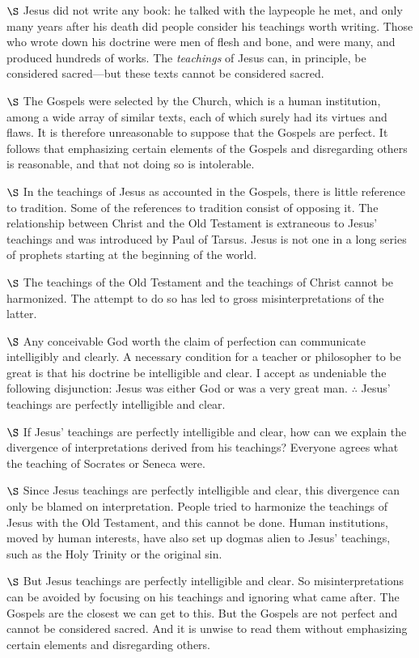 \documentclass[a4paper, 12pt]{article}
\begin{document}
$\S$ Jesus did not write any book: he talked with the laypeople he met, and only
many years after his death did people consider his teachings worth writing.
Those who wrote down his doctrine were men of flesh and bone, and were many, and
produced hundreds of works. The \textit{teachings} of Jesus can, in principle,
be considered sacred---but these texts cannot be considered sacred.

$\S$ The Gospels were selected by the Church, which is a human institution,
among a wide array of similar texts, each of which surely had its virtues and
flaws. It is therefore unreasonable to suppose that the Gospels are perfect. It
follows that emphasizing certain elements of the Gospels and disregarding others
is reasonable, and that not doing so is intolerable. 

$\S$ In the teachings of Jesus as accounted in the Gospels, there is little
reference to tradition. Some of the references to tradition consist of opposing
it. The relationship between Christ and the Old Testament is extraneous to
Jesus' teachings and was introduced by Paul of Tarsus. Jesus is not one in a
long series of prophets starting at the beginning of the world.

$\S$ The teachings of the Old Testament and the teachings of Christ cannot be
harmonized. The attempt to do so has led to gross misinterpretations of the
latter.

$\S$ Any conceivable God worth the claim of perfection can communicate intelligibly
and clearly. A necessary condition for a teacher or philosopher to be great is
that his doctrine be intelligible and clear. I accept as undeniable the
following disjunction: Jesus was either God or was a very great man. $\therefore $ 
Jesus' teachings are perfectly intelligible and clear.

$\S$ If Jesus' teachings are perfectly intelligible and clear, how can we
explain the divergence of interpretations derived from his teachings? Everyone
agrees what the teaching of Socrates or Seneca were. 

$\S$ Since Jesus teachings are perfectly intelligible and clear, this divergence
can only be blamed on interpretation. People tried to harmonize the teachings of
Jesus with the Old Testament, and this cannot be done. Human institutions, moved
by human interests, have also set up dogmas alien to Jesus' teachings, such as
the Holy Trinity or the original sin.

$\S$ But Jesus teachings are perfectly intelligible and clear. So
misinterpretations can be avoided by focusing on his teachings and ignoring what
came after. The Gospels are the closest we can get to this. But the Gospels are
not perfect and cannot be considered sacred. And it is unwise to read them
without emphasizing certain elements and disregarding others.
\end{document}
